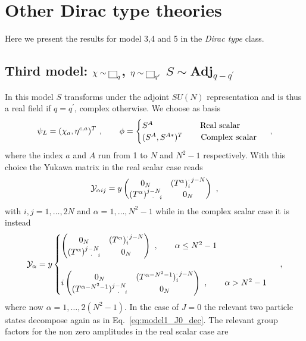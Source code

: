 \documentclass[a4paper,11pt]{article}
\newcommand{\be}{\begin{equation}}
\newcommand{\ee}{\end{equation}}
\begin{document}
\section{Other Dirac type theories}\label{app:dirac}

Here we present the results for model 3,4 and 5 in the {\emph{Dirac type}} class.


\subsection{Third model: $\chi\sim {\tiny{\fbox{$\protect\phantom s$} }}_q$, $\eta\sim {\tiny{\fbox{$\protect\phantom s$} }}_{q^\prime}$ $S\sim$Adj$_{q-q^\prime}$ }\label{sec:model3}

In this model $S$ transforms under the adjoint $SU(N)$ representation and is thus a real field if $q=q^\prime$, complex otherwise. We choose as basis
\be
\psi_L = (\chi_{a},\eta^{c,a})^T\ , \qquad
\phi=
\begin{cases}
S^A \qquad\qquad\quad \, \, \,  \, {\rm Real~scalar}\\
(S^A,S^{A*})^T \qquad  {\rm \, Complex~scalar}\\
\end{cases} \ , 
\ee
where the index $a$ and $A$ run from 1 to $N$ and $N^2-1$ respectively. With this choice the Yukawa matrix in the real scalar case reads
\be
{\cal Y}_{\alpha  i j}= y
\begin{pmatrix}
 0_N  &(T^\alpha)_i^{\cdot \, j-N}\\
(T^\alpha)^{j-N}_{~~\cdot~~ i} & 0_N
\end{pmatrix} \ ,
\ee
with $i,j=1,\dots,2N$ and $\alpha=1,\dots,N^2-1$ while in the complex scalar case it is instead
\be
{\cal Y}_{\alpha }= y
\begin{cases}
\begin{pmatrix}
 0_N  &(T^\alpha)_i^{\cdot \, j-N}\\
(T^\alpha)^{j-N}_{~~\cdot~~ i} & 0_N
\end{pmatrix}  \ , \qquad \alpha \le N^2-1 \\
\\
%
i\begin{pmatrix}
 0_N  &(T^{\alpha-N^2-1})_i^{\cdot \, j-N}\\
(T^{\alpha-N^2-1})^{j-N}_{~~\cdot~~ i} & 0_N
\end{pmatrix} \ , \qquad \alpha > N^2-1
\end{cases} \ ,
\ee
where now  $\alpha=1,\dots,2(N^2-1)$.  In the case of $J=0$ the relevant two particle states decompose again as in Eq.~\eqref{eq:model1_J0_dec}. The relevant group factors for the non zero amplitudes in the real scalar case are
\end{document}
